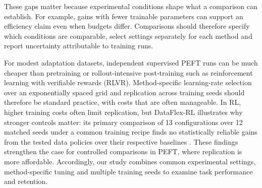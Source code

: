 These gaps matter because experimental conditions shape what a comparison can establish.
For example, gains with fewer trainable parameters can support an efficiency claim even when budgets differ.
Comparisons should therefore specify which conditions are comparable, select settings separately for each method and report uncertainty attributable to training runs.

For modest adaptation datasets, independent supervised PEFT runs can be much cheaper than pretraining or rollout-intensive post-training such as reinforcement learning with verifiable rewards (RLVR).
Method-specific learning-rate selection over an exponentially spaced grid and replication across training seeds should therefore be standard practice, with costs that are often manageable.
In RL, higher training costs often limit replication, but DataFlex-RL illustrates why stronger controls matter: its primary comparison of 13 configurations over 12 matched seeds under a common training recipe finds no statistically reliable gains from the tested data policies over their respective baselines \citep{liang2026dataflexrlevaluationplatformrlvr}.
These findings strengthen the case for controlled comparisons in PEFT, where replication is more affordable.
Accordingly, our study combines common experimental settings, method-specific tuning and multiple training seeds to examine task performance and retention.
